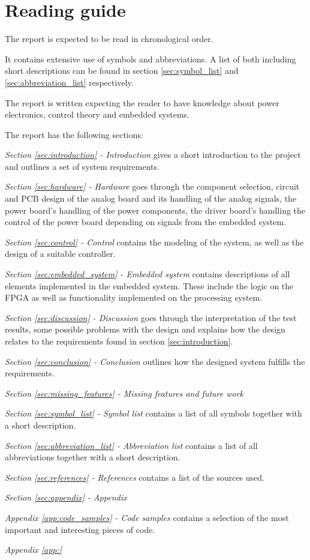 \section{Reading guide}
The report is expected to be read in chronological order. 

It contains extensive use of symbols and abbreviations. A list of both including short descriptions can be found in section \ref{sec:symbol_list} and \ref{sec:abbreviation_list} respectively. 

The report is written expecting the reader to have knowledge about power electronics, control theory and embedded systems.

\medskip
The report has the following sections:

\medskip
\emph{Section \ref{sec:introduction} - Introduction} gives a short introduction to the project and outlines a set of system requirements.

\medskip
\emph{Section \ref{sec:hardware} - Hardware} goes through the component selection, circuit and PCB design of the analog board and its handling of the analog signals, the power board's handling of the power components, the driver board's handling the control of the power board depending on signals from the embedded system.

\medskip
\emph{Section \ref{sec:control} - Control} contains the modeling of the system, as well as the design of a suitable controller. 

\medskip
\emph{Section \ref{sec:embedded_system} - Embedded system} contains descriptions of all elements implemented in the embedded system. These include the logic on the FPGA as well as functionality implemented on the processing system. 

\medskip
\emph{Section \ref{sec:discussion} - Discussion} goes through the interpretation of the test results, some possible problems with the design and explains how the design relates to the requirements found in section \ref{sec:introduction}.

\medskip
\emph{Section \ref{sec:conclusion} - Conclusion} outlines how the designed system fulfills the requirements.

\medskip
\emph{Section \ref{sec:missing_features} - Missing features and future work} 

\medskip
\emph{Section \ref{sec:symbol_list} - Symbol list} contains a list of all symbols together with a short description.

\medskip
\emph{Section \ref{sec:abbreviation_list} - Abbreviation list} contains a list of all abbreviations together with a short description.

\medskip
\emph{Section \ref{sec:references} - References} contains a list of the sources used.


\medskip
\emph{Section \ref{sec:appendix} - Appendix} 

\quad \textit{Appendix \ref{app:code_samples} - Code samples} contains a selection of the most important and interesting pieces of code.

\quad \textit{Appendix \ref{app:}} 
